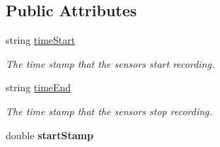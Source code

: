 \subsection*{Public Attributes}
\begin{DoxyCompactItemize}
\item 
string \hyperlink{classkinect_expirement_1_1_kinect_form_af26c689e66a18aa21dfb11a8ec01a6dd}{time\+Start}
\begin{DoxyCompactList}\small\item\em The time stamp that the sensors start recording. \end{DoxyCompactList}\item 
string \hyperlink{classkinect_expirement_1_1_kinect_form_ae6cd686e49bc40b85ce2fdb1a053be6a}{time\+End}
\begin{DoxyCompactList}\small\item\em The time stamp that the sensors stop recording. \end{DoxyCompactList}\item 
double {\bfseries start\+Stamp}\hypertarget{classkinect_expirement_1_1_kinect_form_a97ad5d8c12f02f602249feaedc45e551}{}\label{classkinect_expirement_1_1_kinect_form_a97ad5d8c12f02f602249feaedc45e551}


\end{DoxyCompactItemize}
